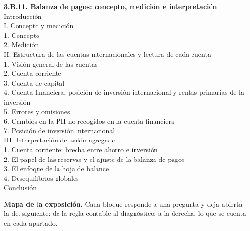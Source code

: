 \documentclass[11pt]{article}
\begin{document}
\begin{esquema}[unbreakable]
\textbf{3.B.11. Balanza de pagos: concepto, medición e interpretación}\\[2pt]
Introducción\\
I. Concepto y medición\\
\hspace*{1.5em}1. Concepto\\
\hspace*{1.5em}2. Medición\\
II. Estructura de las cuentas internacionales y lectura de cada cuenta\\
\hspace*{1.5em}1. Visión general de las cuentas\\
\hspace*{1.5em}2. Cuenta corriente\\
\hspace*{1.5em}3. Cuenta de capital\\
\hspace*{1.5em}4. Cuenta financiera, posición de inversión internacional y rentas primarias de la inversión\\
\hspace*{1.5em}5. Errores y omisiones\\
\hspace*{1.5em}6. Cambios en la PII no recogidos en la cuenta financiera\\
\hspace*{1.5em}7. Posición de inversión internacional\\
III. Interpretación del saldo agregado\\
\hspace*{1.5em}1. Cuenta corriente: brecha entre ahorro e inversión\\
\hspace*{1.5em}2. El papel de las reservas y el ajuste de la balanza de pagos\\
\hspace*{1.5em}3. El enfoque de la hoja de balance\\
\hspace*{1.5em}4. Desequilibrios globales\\
Conclusión
\end{esquema}

\begin{anotaciones}
\textbf{Mapa de la exposición.} Cada bloque responde a una pregunta y deja abierta la del siguiente: de la regla contable al diagnóstico; a la derecha, lo que se cuenta en cada apartado.
\begin{infografiacaja}
\caption{Mapa del tema: la pregunta de cada bloque, sus apartados y el hilo que los une}\label{figu:mapa-tema}
\end{infografiacaja}
\end{anotaciones}
\end{document}
